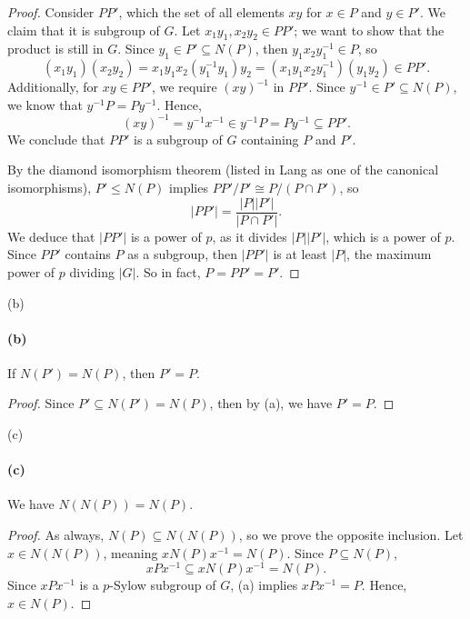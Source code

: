 \documentclass[12pt]{article}
\newlength{\myparskip}
\newenvironment{fullbox}{\begin{lrbox}{\savefullbox}\begin{minipage}{\dimexpr\textwidth-2\fboxsep\relax}\setlength{\parskip}{\myparskip}}{\end{minipage}\end{lrbox}\framebox[\textwidth]{\usebox{\savefullbox}}}
\newenvironment{pbox}[1][]{\begin{fullbox}\ifx#1\empty\else\paragraph{#1}\fi}{\end{fullbox}}
\newcommand{\<}{\langle}
\renewcommand{\>}{\rangle}
\newcommand{\isom}{\cong}
\begin{document}
\begin{proof}
    Consider $PP'$, which the set of all elements $xy$ for $x \in P$ and $y \in P'$. We claim that it is subgroup of $G$. Let $x_1y_1, x_2y_2 \in PP'$; we want to show that the product is still in $G$. Since $y_1 \in P' \subseteq N(P)$, then $y_1x_2y_1^{-1} \in P$, so
    \[
        (x_1y_1)(x_2y_2)
            = x_1y_1x_2(y_1^{-1}y_1)y_2
            = (x_1y_1x_2y_1^{-1})(y_1y_2)
            \in PP'.
    \]
    Additionally, for $xy \in PP'$, we require $(xy)^{-1}$ in $PP'$. Since $y^{-1} \in P' \subseteq N(P)$, we know that $y^{-1}P = Py^{-1}$. Hence,
    \[
        (xy)^{-1}
            = y^{-1}x^{-1}
            \in y^{-1}P
            = Py^{-1}
            \subseteq PP'.
    \]
    We conclude that $PP'$ is a subgroup of $G$ containing $P$ and $P'$.
    
    By the diamond isomorphism theorem (listed in Lang as one of the canonical isomorphisms), $P' \leq N(P)$ implies $PP'/P' \isom P/(P \cap P')$, so
    \[
        |PP'| = \frac{|P| |P'|}{|P \cap P'|}.
    \]
    We deduce that $|PP'|$ is a power of $p$, as it divides $|P||P'|$, which is a power of $p$. Since $PP'$ contains $P$ as a subgroup, then $|PP'|$ is at least $|P|$, the maximum power of $p$ dividing $|G|$. So in fact, $P = PP' = P'$.

\end{proof}

\begin{pbox}[(b)]
    If $N(P') = N(P)$, then $P' = P$.
\end{pbox}

\begin{proof}
    Since $P' \subseteq N(P') = N(P)$, then by (a), we have $P' = P$.

\end{proof}

\begin{pbox}[(c)]
    We have $N(N(P)) = N(P)$.
\end{pbox}

\begin{proof}
    As always, $N(P) \subseteq N(N(P))$, so we prove the opposite inclusion. Let $x \in N(N(P))$, meaning $xN(P)x^{-1} = N(P)$. Since $P \subseteq N(P)$,
    \[
        xPx^{-1}
            \subseteq xN(P)x^{-1}
            = N(P).
    \]
    Since $xPx^{-1}$ is a $p$-Sylow subgroup of $G$, (a) implies $xPx^{-1} = P$. Hence, $x \in N(P)$.

\end{proof}
\end{document}
